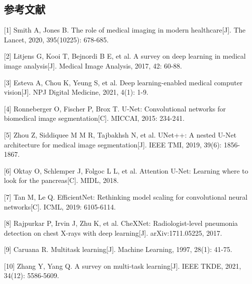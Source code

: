\documentclass{harryopo-mathnotes}
\begin{document}
\subsection{参考文献}

[1] Smith A, Jones B. The role of medical imaging in modern healthcare[J]. The Lancet, 2020, 395(10225): 678-685.

[2] Litjens G, Kooi T, Bejnordi B E, et al. A survey on deep learning in medical image analysis[J]. Medical Image Analysis, 2017, 42: 60-88.

[3] Esteva A, Chou K, Yeung S, et al. Deep learning-enabled medical computer vision[J]. NPJ Digital Medicine, 2021, 4(1): 1-9.

[4] Ronneberger O, Fischer P, Brox T. U-Net: Convolutional networks for biomedical image segmentation[C]. MICCAI, 2015: 234-241.

[5] Zhou Z, Siddiquee M M R, Tajbakhsh N, et al. UNet++: A nested U-Net architecture for medical image segmentation[J]. IEEE TMI, 2019, 39(6): 1856-1867.

[6] Oktay O, Schlemper J, Folgoc L L, et al. Attention U-Net: Learning where to look for the pancreas[C]. MIDL, 2018.

[7] Tan M, Le Q. EfficientNet: Rethinking model scaling for convolutional neural networks[C]. ICML, 2019: 6105-6114.

[8] Rajpurkar P, Irvin J, Zhu K, et al. CheXNet: Radiologist-level pneumonia detection on chest X-rays with deep learning[J]. arXiv:1711.05225, 2017.

[9] Caruana R. Multitask learning[J]. Machine Learning, 1997, 28(1): 41-75.

[10] Zhang Y, Yang Q. A survey on multi-task learning[J]. IEEE TKDE, 2021, 34(12): 5586-5609.
\end{document}
